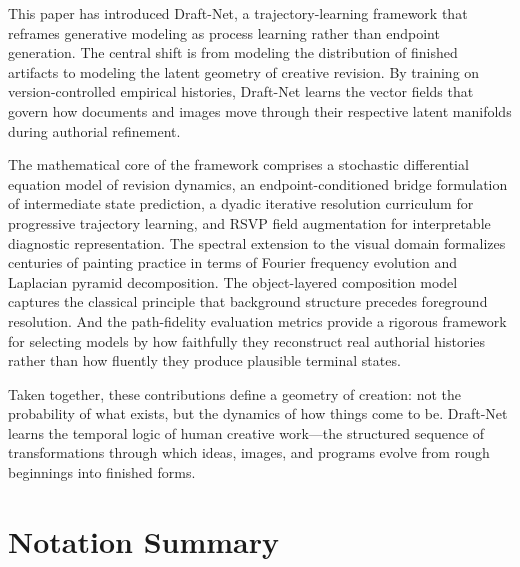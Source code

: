 \documentclass[12pt,a4paper]{article}
\theoremstyle{draftthm}
\begin{document}
This paper has introduced Draft-Net, a trajectory-learning framework that reframes generative modeling as process learning rather than endpoint generation. The central shift is from modeling the distribution of finished artifacts to modeling the latent geometry of creative revision. By training on version-controlled empirical histories, Draft-Net learns the vector fields that govern how documents and images move through their respective latent manifolds during authorial refinement.

The mathematical core of the framework comprises a stochastic differential equation model of revision dynamics, an endpoint-conditioned bridge formulation of intermediate state prediction, a dyadic iterative resolution curriculum for progressive trajectory learning, and RSVP field augmentation for interpretable diagnostic representation. The spectral extension to the visual domain formalizes centuries of painting practice in terms of Fourier frequency evolution and Laplacian pyramid decomposition. The object-layered composition model captures the classical principle that background structure precedes foreground resolution. And the path-fidelity evaluation metrics provide a rigorous framework for selecting models by how faithfully they reconstruct real authorial histories rather than how fluently they produce plausible terminal states.

Taken together, these contributions define a geometry of creation: not the probability of what exists, but the dynamics of how things come to be. Draft-Net learns the temporal logic of human creative work---the structured sequence of transformations through which ideas, images, and programs evolve from rough beginnings into finished forms.

\appendix
\section{Notation Summary}
\end{document}
